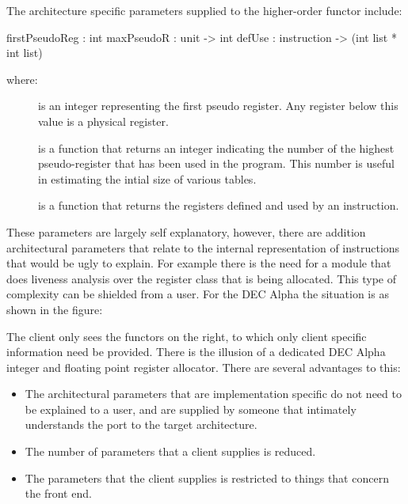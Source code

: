   The architecture specific parameters supplied to the higher-order
  functor include:
\begin{SML}
  firstPseudoReg : int
  maxPseudoR : unit -> int
  defUse : instruction -> (int list * int list)
\end{SML}

  where: 
\begin{description}  
    \item[] is an integer representing the first
    pseudo register. Any register below this value is a physical
    register.
 
    \item[] is a function that returns an
    integer indicating the number of the highest pseudo-register that
    has been used in the program. This number is useful in estimating
    the intial size of various tables.

    \item[] is a function that returns the
    registers defined and used by an instruction.
\end{description}

  These parameters are largely self explanatory, however, there are
  addition architectural parameters that relate to the internal
  representation of instructions that would be ugly to explain. For
  example there is the need for a module that does liveness analysis
  over the register class that is being allocated. This type of
  complexity can be shielded from a user.  For the DEC Alpha the
  situation is as shown in the figure:


  The client only sees the functors on the right, to which only client
  specific information need be provided. There is the illusion of a
  dedicated DEC Alpha integer and floating point register
  allocator. There are several advantages to this:
  \begin{itemize}
    \item The architectural parameters that are implementation specific
do not need to be explained to a user, and are supplied by someone
that intimately understands the port to the target architecture. 

     \item The number of parameters that a client supplies is
reduced.

     \item The parameters that the client supplies is restricted to
things that concern the front end. 
  \end{itemize}
